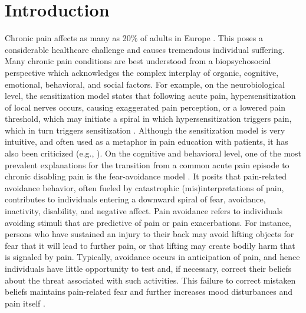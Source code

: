 \documentclass[twocolumn, serif, authordate, empirical]{jote-article}
\begin{document}
 {}\section*{Introduction} 

Chronic pain affects as many as 20\% of adults in Europe \parencite{SocietalImpactofPain2017}. This poses a considerable healthcare challenge and causes tremendous individual suffering. Many chronic pain conditions are best understood from a biopsychosocial perspective which acknowledges the complex interplay of organic, cognitive, emotional, behavioral, and social factors. For example, on the neurobiological level, the sensitization model states that following acute pain, hypersensitization of local nerves occurs, causing exaggerated pain perception, or a lowered pain threshold, which may initiate a spiral in which hypersensitization triggers pain, which in turn triggers sensitization \parencite{vanWilgen2012, Meeus2007}. Although the sensitization model is very intuitive, and often used as a metaphor in pain education with patients, it has also been criticized (e.g., ). On the cognitive and behavioral level, one of the most prevalent explanations for the transition from a common acute pain episode to chronic disabling pain is the fear-avoidance model \parencite{Vlaeyen2016, Vlaeyen2000, Vlaeyen2020}. It posits that pain-related avoidance behavior, often fueled by catastrophic (mis)interpretations of pain, contributes to individuals entering a downward spiral of fear, avoidance, inactivity, disability, and negative affect. Pain avoidance refers to individuals avoiding stimuli that are predictive of pain or pain exacerbations. For instance, persons who have sustained an injury to their back may avoid lifting objects for fear that it will lead to further pain, or that lifting may create bodily harm that is signaled by pain. Typically, avoidance occurs in anticipation of pain, and hence individuals have little opportunity to test and, if necessary, correct their beliefs about the threat associated with such activities. This failure to correct mistaken beliefs maintains pain-related fear and further increases mood disturbances and pain itself \parencite{vanVliet2018, Vlaeyen2000}.~
\end{document}

